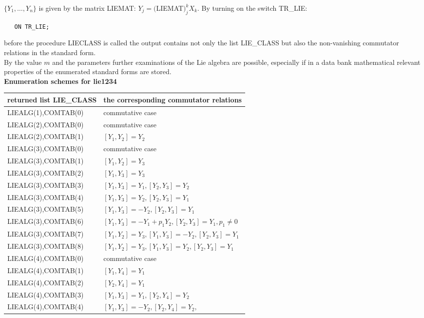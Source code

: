 $\{Y_1,\ldots,Y_n\}$ is given by the matrix LIEMAT:
$Y_j=($LIEMAT$)_j^k X_k$.\newpage
By turning on the switch TR\_LIE:
\begin{verbatim}
   ON TR_LIE;
\end{verbatim}
before the procedure LIECLASS is called the output contains not only the
list LIE\_CLASS but also the non-vanishing commutator relations in the
standard form.\\[0.1cm]
By the value $m$ and the parameters further examinations of the Lie algebra
are possible, especially if in a data bank mathematical relevant properties
of the enumerated standard forms are stored.\\[0.3cm]
{\large\bf Enumeration schemes for lie1234}\\[0.2cm]
\hspace*{0.3cm}\begin{tabular}{l|l}returned list LIE\_CLASS&
the corresponding commutator relations\\[0.1cm]\hline
{LIEALG(1),COMTAB(0)}&commutative case\\[0.1cm]\hline
{LIEALG(2),COMTAB(0)}&commutative case\\[0.1cm]
{LIEALG(2),COMTAB(1)}&$[Y_1,Y_2]=Y_2$\\[0.1cm]\hline
{LIEALG(3),COMTAB(0)}&commutative case\\[0.1cm]
{LIEALG(3),COMTAB(1)}&$[Y_1,Y_2]=Y_3$\\[0.1cm]
{LIEALG(3),COMTAB(2)}&$[Y_1,Y_3]=Y_3$\\[0.1cm]
{LIEALG(3),COMTAB(3)}&$[Y_1,Y_3]=Y_1,[Y_2,Y_3]=Y_2$\\[0.1cm]
{LIEALG(3),COMTAB(4)}&$[Y_1,Y_3]=Y_2,[Y_2,Y_3]=Y_1$\\[0.1cm]
{LIEALG(3),COMTAB(5)}&$[Y_1,Y_3]=-Y_2,[Y_2,Y_3]=Y_1$\\[0.1cm]
{LIEALG(3),COMTAB(6)}&$[Y_1,Y_3]=-Y_1+p_1 Y_2,[Y_2,Y_3]=Y_1,p_1\neq 0$\\[0.1cm]
{LIEALG(3),COMTAB(7)}&$[Y_1,Y_2]=Y_3,[Y_1,Y_3]=-Y_2,[Y_2,Y_3]=Y_1$\\[0.1cm]
{LIEALG(3),COMTAB(8)}&$[Y_1,Y_2]=Y_3,[Y_1,Y_3]=Y_2,[Y_2,Y_3]=Y_1$\\[0.1cm]\hline
{LIEALG(4),COMTAB(0)}&commutative case\\[0.1cm]
{LIEALG(4),COMTAB(1)}&$[Y_1,Y_4]=Y_1$\\[0.1cm]
{LIEALG(4),COMTAB(2)}&$[Y_2,Y_4]=Y_1$\\[0,1cm]
{LIEALG(4),COMTAB(3)}&$[Y_1,Y_3]=Y_1,[Y_2,Y_4]=Y_2$\\[0.1cm]
{LIEALG(4),COMTAB(4)}&$[Y_1,Y_3]=-Y_2,[Y_2,Y_4]=Y_2,$\\

\end{tabular}
